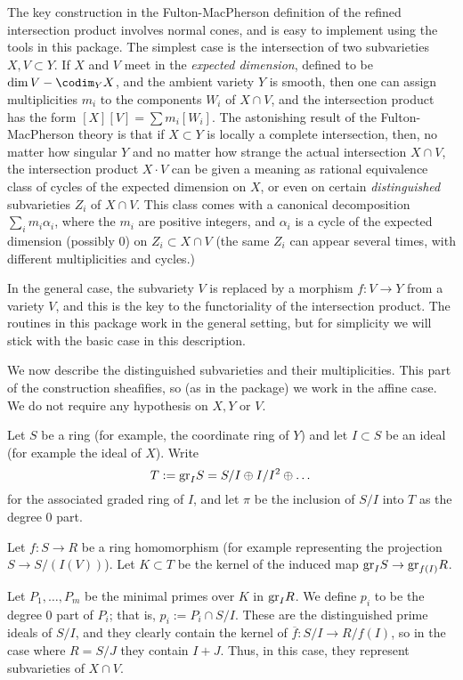 \documentclass[twoside,12pt, leqno]{amsart}
\def\gr{{\rm gr}}
\begin{document}
The key construction in the Fulton-MacPherson definition of the refined intersection  product 
\cite[Section 6.1]{F}
involves normal cones, and is easy to implement using the tools in this package. The simplest case is the intersection of two subvarieties $X,V\subset Y$. If $X$ and $V$ meet in the \emph{expected dimension}, defined to be $\dim V - \codim_{Y} X$,
and the ambient variety $Y$ is smooth, then one can assign multiplicities $m_{i}$ to the components $W_{i}$ of $X\cap V$, and the 
intersection product has the form $[X][V] = \sum m_{i}[W_{i}].$
The astonishing result of the Fulton-MacPherson theory is that if $X\subset Y$ is locally a complete intersection, then, no matter how singular $Y$ and no matter how strange the actual intersection $X\cap V$, the intersection product 
$X\cdot V$ can be given a meaning as rational equivalence class of cycles of the expected dimension on $X$, or even on certain \emph{distinguished} subvarieties $Z_{i}$ of $X\cap V$. This class comes with a canonical decomposition $\sum_{i}m_{i}\alpha_{i}$, 
where the $m_{i}$ are positive integers, and $\alpha_{i}$ is a cycle of the expected dimension (possibly 0)
on  $Z_{i}\subset X\cap V$ (the same $Z_{i}$ can appear several times, with different multiplicities and cycles.)

In the general case, the subvariety $V$ is replaced by a morphism $f:V\to Y$ from a variety $V$, and this is the key to the functoriality of the intersection product. The routines in this package work in the general setting, but for simplicity we will stick with the basic case in this description.

We now describe the distinguished subvarieties and their multiplicities. This part of the construction sheafifies, so (as in the package) we work in the affine case. We do not require any hypothesis on $X, Y$ or $V$. 

Let $S$ be a ring (for example, the coordinate ring of $Y$) and let $I\subset S$ be an ideal (for example the ideal of $X$).
Write
$$
T:=\gr_{I}S = S/I\oplus I/I^{2}\oplus\dots
$$ 
for the associated graded ring  of $I$, and let
$\pi$ be the inclusion of $S/I$ into $T$ as the degree 0 part.

Let $f:S\to R$ be a ring homomorphism (for example representing the projection $S\to S/(I(V))$). Let $K\subset T$ be the kernel of the induced map $ \gr_{I}S \to \gr_{f(I)}R$.  

Let $P_{1},\dots, P_{m}$ be the minimal primes over $K$ in $\gr_{I}R$. We define $p_{i}$ to be the degree 0 part of $P_{i}$; that is, $p_{i} := P_{i}\cap S/I$. These are the distinguished prime ideals of $S/I$, and they clearly contain the kernel of $\overline f: S/I \to R/f(I)$, so in the case where $R = S/J$ they contain $I+J$.  Thus, in this case, they  represent subvarieties
of $X\cap V$.
\end{document}
